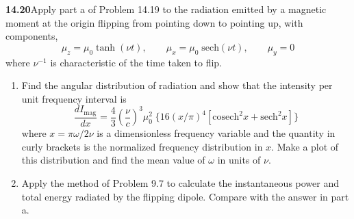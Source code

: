 \par\bigskip
\noindent\textbf{14.20}\quad Apply part a of Problem 14.19 to the radiation emitted by a magnetic moment at the origin flipping from pointing down to pointing up, with components,
\[
\mu_{z}=\mu_{0}\tanh(\nu t),\qquad\mu_{x}=\mu_{0}\;\mathrm{sech}(\nu t),\qquad\mu_{y}=0
\]
where $\nu^{-1}$ is characteristic of the time taken to flip.
\begin{enumerate}
\item[(a)] Find the angular distribution of radiation and show that the intensity per unit frequency interval is
\[
\frac{dI_{\mathrm{mag}}}{dx}=\frac{4}{3}\left(\frac{\nu}{c}\right)^{3}\!\mu_{0}^{2}\;\{16(x/\pi)^{4}[\mathrm{cosech}^{2}x+\mathrm{sech}^{2}x]\}
\]
where $x=\pi\omega/2\nu$ is a dimensionless frequency variable and the quantity in curly brackets is the normalized frequency distribution in $x$. Make a plot of this distribution and find the mean value of $\omega$ in units of $\nu$.
\item[(b)] Apply the method of Problem 9.7 to calculate the instantaneous power and total energy radiated by the flipping dipole. Compare with the answer in part a.
\end{enumerate}
\solution

